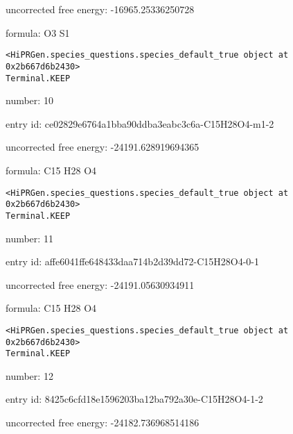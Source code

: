 \documentclass{article}
\begin{document}
uncorrected free energy: -16965.25336250728



formula: O3 S1


\vspace{1cm}
\begin{verbatim}
<HiPRGen.species_questions.species_default_true object at 0x2b667d6b2430>
Terminal.KEEP
\end{verbatim}


number: 10



entry id: ce02829e6764a1bba90ddba3eabc3c6a-C15H28O4-m1-2



uncorrected free energy: -24191.628919694365



formula: C15 H28 O4


\vspace{1cm}
\begin{verbatim}
<HiPRGen.species_questions.species_default_true object at 0x2b667d6b2430>
Terminal.KEEP
\end{verbatim}


number: 11



entry id: affe6041ffe648433daa714b2d39dd72-C15H28O4-0-1



uncorrected free energy: -24191.05630934911



formula: C15 H28 O4


\vspace{1cm}
\begin{verbatim}
<HiPRGen.species_questions.species_default_true object at 0x2b667d6b2430>
Terminal.KEEP
\end{verbatim}


number: 12



entry id: 8425c6cfd18e1596203ba12ba792a30e-C15H28O4-1-2



uncorrected free energy: -24182.736968514186
\end{document}
